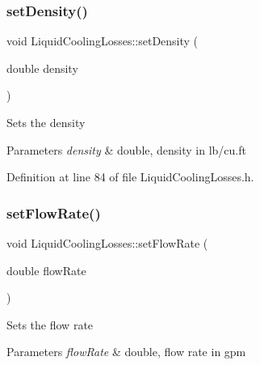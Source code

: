 \mbox{\label{class_liquid_cooling_losses_a1fcb1780b588e0a6e5ca052ce2b360dc}} 
\subsubsection{\texorpdfstring{set\+Density()}{setDensity()}}
{\footnotesize\ttfamily void Liquid\+Cooling\+Losses\+::set\+Density (\begin{DoxyParamCaption}\item[{double}]{density }\end{DoxyParamCaption})\hspace{0.3cm}{\ttfamily [inline]}}

Sets the density


\begin{DoxyParams}{Parameters}
{\em density} & double, density in lb/cu.\+ft \\
\hline
\end{DoxyParams}


Definition at line 84 of file Liquid\+Cooling\+Losses.\+h.

\mbox{\label{class_liquid_cooling_losses_a7739742c5f21919a62c304b7c525b1b6}} 
\subsubsection{\texorpdfstring{set\+Flow\+Rate()}{setFlowRate()}}
{\footnotesize\ttfamily void Liquid\+Cooling\+Losses\+::set\+Flow\+Rate (\begin{DoxyParamCaption}\item[{double}]{flow\+Rate }\end{DoxyParamCaption})\hspace{0.3cm}{\ttfamily [inline]}}

Sets the flow rate


\begin{DoxyParams}{Parameters}
{\em flow\+Rate} & double, flow rate in gpm \\
\hline
\end{DoxyParams}


